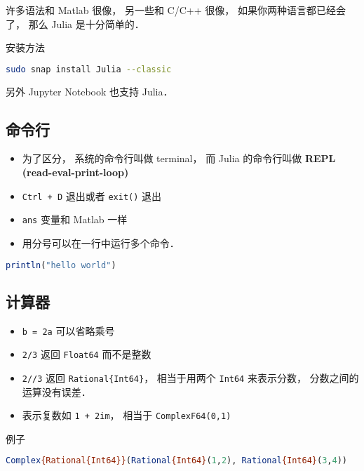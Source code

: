 
\begin{issues}
\issueDraft
\end{issues}

许多语法和 Matlab 很像， 另一些和 C/C++ 很像， 如果你两种语言都已经会了， 那么 Julia 是十分简单的．

安装方法
\begin{lstlisting}[language=bash]
sudo snap install Julia --classic
\end{lstlisting}

另外 Jupyter Notebook 也支持 Julia．

\subsection{命令行}
\begin{itemize}
\item 为了区分， 系统的命令行叫做 terminal， 而 Julia 的命令行叫做 \textbf{REPL (read-eval-print-loop)}
\item \verb|Ctrl + D| 退出或者 \verb|exit()| 退出
\item \verb|ans| 变量和 Matlab 一样
\item 用分号可以在一行中运行多个命令．
\end{itemize}

\begin{lstlisting}[language=Julia]
println("hello world")
\end{lstlisting}

\subsection{计算器}
\begin{itemize}
\item \verb|b = 2a| 可以省略乘号
\item \verb|2/3| 返回 \verb|Float64| 而不是整数
\item \verb|2//3| 返回 \verb|Rational{Int64}|， 相当于用两个 \verb|Int64| 来表示分数， 分数之间的运算没有误差．
\item 表示复数如 \verb|1 + 2im|， 相当于 \verb|ComplexF64(0,1)|
\end{itemize}
例子
\begin{lstlisting}[language=julia]
Complex{Rational{Int64}}(Rational{Int64}(1,2), Rational{Int64}(3,4))
\end{lstlisting}


